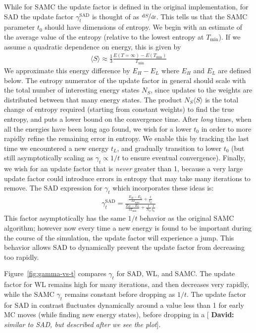 \documentclass[letterpaper,twocolumn,amsmath,amssymb,pre,aps,10pt]{revtex4-1}
\newcommand{\green}[1]{{\bf \color{green} #1}}
\newcommand{\davidsays}[1]{{\color{red} [\green{David:} \emph{#1}]}}
\begin{document}
While for SAMC the update factor is defined in the original
implementation, for SAD the update factor $\gamma_{t}^{\text{SAD}}$ is
thought of as $\nicefrac{\text{d}S}{\text{d}t}$. This tells us that
the SAMC parameter
$t_0$ should have dimensions of entropy.
We begin with an estimate of the average value of the entropy (relative
to the lowest entropy at $T_{\min}$).  If we assume a quadratic
dependence on energy, this is given by
\begin{align}
\langle S\rangle \approx \frac13 \frac{E({T=\infty}) - E(T_{\min})}{T_{\min}}
\end{align}
We approximate this energy difference by
$E_H -E_L$ where $E_H$ and $E_L$ are defined below.
The entropy numerator of the update factor
in general should scale with the total number of interesting
energy states $N_S$, since updates to the weights are distributed between
that many energy states.  The product $N_S\langle S\rangle$ is the
total change of entropy required (starting from constant weights) to find
the true entropy, and puts a lower bound on the convergence time.
After \emph{long} times, when
all the energies have been long ago found,
we wish for a lower $t_0$ in order to more rapidly refine the remaining
error in entropy.  We enable this
by tracking the last time we encountered a new energy $t_L$, and
gradually transition to lower $t_0$ (but still asymptotically scaling
as $\gamma_t \propto 1/t$ to ensure eventual convergence).  Finally,
we wish for an update factor that is \emph{never} greater than 1, because
a very large update factor could introduce errors in entropy that may take
many iterations to remove.  The SAD
expression for $\gamma_t$ which incorporates these ideas is:
\begin{align}
  \gamma_{t}^{\text{SAD}} =
     \frac{
       \frac{E_{H}-E_{L}}{3T_{\text{min}}} + \frac{t}{t_L}
     }{
       \frac{E_{H}-E_{L}}{3T_{\text{min}}} + \frac{t}{N_S}\frac{t}{t_L}
     }
\end{align}
This factor asymptotically has the same $1/t$ behavior as the original
SAMC algorithm;
however now every time a new energy is found to be important
during the course of
the simulation, the update factor will experience a jump. This behavior
allows SAD to dynamically prevent the update factor from decreasing too
rapidly.

Figure~\ref{fig:gamma-vs-t} compares $\gamma_t$ for SAD, WL,
and SAMC.  The update factor
for WL remains high for many iterations, and then decreases very rapidly,
while the SAMC $\gamma_t$ remains constant before dropping as $1/t$.
The update factor for SAD in contrast fluctuates
dynamically around a value less than 1 for early MC moves
(while finding new energy states), before dropping in a \davidsays{similar
to SAD, but described after we see the plot}.
\end{document}
